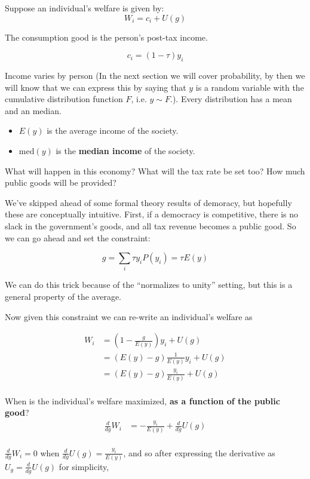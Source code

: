 \documentclass[]{book}
\providecommand{\tightlist}{%
  \setlength{\itemsep}{0pt}\setlength{\parskip}{0pt}}
\theoremstyle{definition}
\theoremstyle{definition}
\theoremstyle{definition}
\theoremstyle{remark}
\begin{document}
Suppose an individual's welfare is given by:
\[W_i = c_i + U(g)\]

The consumption good is the person's post-tax income.

\[c_i = (1 - \tau) y_i\]

Income varies by person (In the next section we will cover probability, by then we will know that we can express this by saying that \(y\) is a random variable with the cumulative distribution function \(F\), i.e. \(y \sim F\).). Every distribution has a mean and an median.

\begin{itemize}
\tightlist
\item
  \(E(y)\) is the average income of the society.
\item
  \(\text{med}(y)\) is the \textbf{median income} of the society.
\end{itemize}

What will happen in this economy? What will the tax rate be set too? How much public goods will be provided?

We've skipped ahead of some formal theory results of demoracy, but hopefully these are conceptually intuitive. First, if a democracy is competitive, there is no slack in the government's goods, and all tax revenue becomes a public good. So we can go ahead and set the constraint:

\[g = \sum_{i} \tau y_i P(y_i) = \tau E(y)\]

We can do this trick because of the ``normalizes to unity'' setting, but this is a general property of the average.

Now given this constraint we can re-write an individual's welfare as

\begin{align*}
W_i &= \left(1 - \frac{g}{E(y)}\right)y_i + U(g)\\
&= \left(E(y) - g\right) \frac{1}{E(y)} y_i + U(g)\\
&= \left(E(y) - g\right) \frac{y_i}{E(y)} + U(g)\\
\end{align*}

When is the individual's welfare maximized, \textbf{as a function of the public good}?
\begin{align*}
\frac{d}{dg}W_i &=  - \frac{y_i}{E(y)} + \frac{d}{dg}U(g)\\
\end{align*}

\(\frac{d}{dg}W_i = 0\) when \(\frac{d}{dg}U(g) = \frac{y_i}{E(y)}\), and so after expressing the derivative as \(U_g = \frac{d}{dg}U(g)\) for simplicity,
\end{document}
